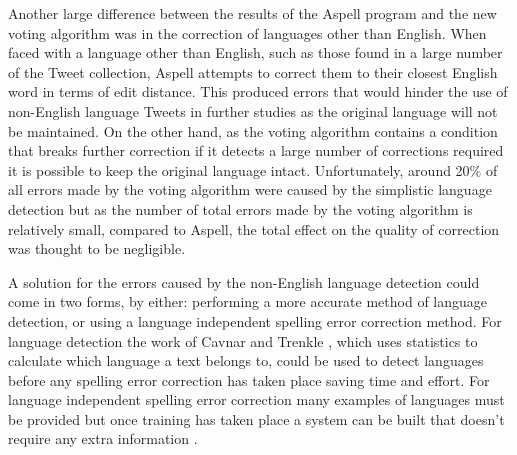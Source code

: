 Another large difference between the results of the Aspell program and the new voting algorithm was in the correction of languages other than English. When faced with a language other than English, such as those found in a large number of the Tweet collection, Aspell attempts to correct them to their closest English word in terms of edit distance. This produced errors that would hinder the use of non-English language Tweets in further studies as the original language will not be maintained. On the other hand, as the voting algorithm contains a condition that breaks further correction if it detects a large number of corrections required it is possible to keep the original language intact. Unfortunately, around 20\% of all errors made by the voting algorithm were caused by the simplistic language detection but as the number of total errors made by the voting algorithm is relatively small, compared to Aspell, the total effect on the quality of correction was thought to be negligible.

A solution for the errors caused by the non-English language detection could come in two forms, by either: performing a more accurate method of language detection, or using a language independent spelling error correction method. For language detection the work of Cavnar and Trenkle \cite{}, which uses statistics to calculate which language a text belongs to, could be used to detect languages before any spelling error correction has taken place saving time and effort. For language independent spelling error correction many examples of languages must be provided but once training has taken place a system can be built that doesn't require any extra information \cite{GOOGLE}.

